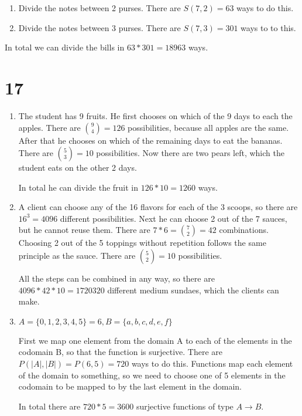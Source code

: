 \documentclass[12pt]{article}
\begin{document}
\begin{enumerate}
	\item
	Divide the notes between 2 purses. There are $S(7, 2) = 63$ ways to do this.
	\item
	Divide the notes between 3 purses. There are $S(7, 3) = 301$ ways to to this.
\end{enumerate}

In total we can divide the bills in $63 * 301 = 18963$ ways.

\section*{17}
\begin{enumerate}[a]
	\item %
	The student has 9 fruits. He first chooses on which of the 9 days to each the apples. There are $\binom{9}{4} = 126$ possibilities, because all apples are the same. After that he chooses on which of the remaining days to eat the bananas. There are $\binom{5}{3} = 10$ possibilities. Now there are two pears left, which the student eats on the other 2 days.

	In total he can divide the fruit in $126 * 10 = 1260$ ways.
	\item %
	A client can choose any of the 16 flavors for each of the 3 scoops, so there are $16^3 = 4096$ different possibilities. Next he can choose 2 out of the 7 sauces, but he cannot reuse them. There are $7 * 6 = \binom{7}{2} = 42$ combinations. Choosing 2 out of the 5 toppings without repetition follows the same principle as the sauce. There are $\binom{5}{2} = 10$ possibilities.

	All the steps can be combined in any way, so there are $4096 * 42 * 10 = 1720320$ different medium sundaes, which the clients can make.
	\item %
	$A = \{0, 1, 2, 3, 4, 5\} = 6, B = \{a, b, c, d, e, f\}$

	First we map one element from the domain A to each of the elements in the codomain B, so that the function is surjective. There are $P(|A|, |B|) =  P(6,5) = 720$ ways to do this. Functions map each element of the domain to something, so we need to choose one of 5 elements in the codomain to be mapped to by the last element in the domain.

	In total there are $720 * 5 = 3600$ surjective functions of type $A \rightarrow B$.
\end{enumerate}
\end{document}
